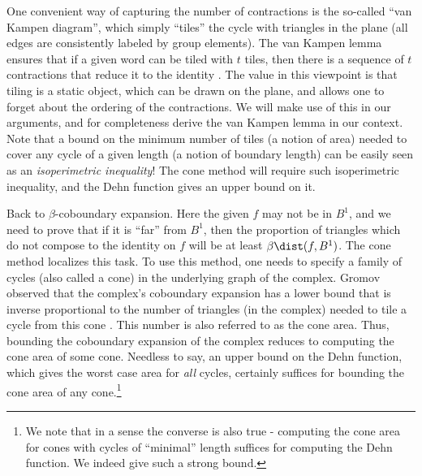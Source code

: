 One convenient way of capturing the number of contractions is the so-called ``van Kampen diagram'', which simply ``tiles'' the cycle with triangles in the plane (all edges are consistently labeled by group elements). The van Kampen lemma ensures that if a given word can be tiled with $t$ tiles, then there is a sequence of $t$ contractions that reduce it to the identity \cite{VanKampen1933}. The value in this viewpoint is that tiling is a static object, which can be drawn on the plane, and allows one to forget about the ordering of the contractions.
%
We will make use of this in our arguments, and for completeness derive the van Kampen lemma in our context. Note that a bound on the minimum number of tiles (a notion of area) needed to cover any cycle of a given length (a notion of boundary length) can be easily seen as an \emph{isoperimetric inequality}! %
The cone method will require such isoperimetric inequality, and the Dehn function gives an upper bound on it.

Back to $\beta$-coboundary expansion. Here the given $f$ may not be in $B^1$, and we need to prove that if it is ``far'' from $B^1$, then the proportion of triangles which do not compose to the identity on $f$ will be at least $\beta \dist(f,B^1)$. The cone method localizes this task. To use this method, one needs to specify a family of cycles (also called a cone) in the underlying graph of the complex. Gromov observed that the complex's coboundary expansion has a lower bound that is inverse proportional to the number of triangles (in the complex) needed to tile a cycle from this cone \cite{Gromov2010}. This number is also referred to as the cone area.
Thus, bounding the coboundary expansion of the complex reduces to computing the cone area of some cone. Needless to say, an upper bound on the Dehn function, which gives the worst case area for \emph{all} cycles, certainly suffices for bounding the cone area of any cone.\footnote{We note that in a sense the converse is also true - computing the cone area for cones with cycles of ``minimal'' length suffices for computing the Dehn function. We indeed give such a strong bound.}

